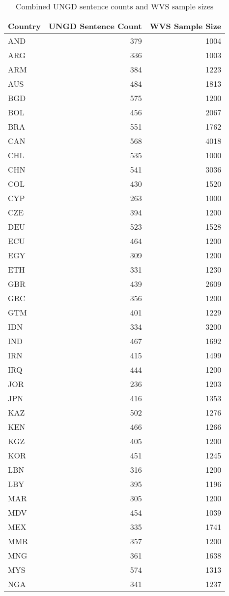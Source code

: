 \begin{table}
\caption{Combined UNGD sentence counts and WVS sample sizes}
\label{tab:combined}
\begin{tabular}{lrr}
\toprule
Country & UNGD Sentence Count & WVS Sample Size \\
\midrule
AND & 379 & 1004 \\
ARG & 336 & 1003 \\
ARM & 384 & 1223 \\
AUS & 484 & 1813 \\
BGD & 575 & 1200 \\
BOL & 456 & 2067 \\
BRA & 551 & 1762 \\
CAN & 568 & 4018 \\
CHL & 535 & 1000 \\
CHN & 541 & 3036 \\
COL & 430 & 1520 \\
CYP & 263 & 1000 \\
CZE & 394 & 1200 \\
DEU & 523 & 1528 \\
ECU & 464 & 1200 \\
EGY & 309 & 1200 \\
ETH & 331 & 1230 \\
GBR & 439 & 2609 \\
GRC & 356 & 1200 \\
GTM & 401 & 1229 \\
IDN & 334 & 3200 \\
IND & 467 & 1692 \\
IRN & 415 & 1499 \\
IRQ & 444 & 1200 \\
JOR & 236 & 1203 \\
JPN & 416 & 1353 \\
KAZ & 502 & 1276 \\
KEN & 466 & 1266 \\
KGZ & 405 & 1200 \\
KOR & 451 & 1245 \\
LBN & 316 & 1200 \\
LBY & 395 & 1196 \\
MAR & 305 & 1200 \\
MDV & 454 & 1039 \\
MEX & 335 & 1741 \\
MMR & 357 & 1200 \\
MNG & 361 & 1638 \\
MYS & 574 & 1313 \\
NGA & 341 & 1237 \\

\end{tabular}
\end{table}

